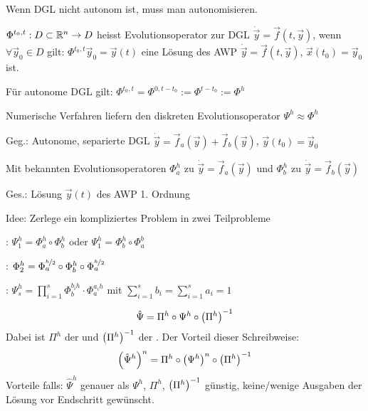 Wenn DGL nicht autonom ist, muss man autonomisieren.

\vspace{1\baselineskip}


$\Phi^{t_0,t} : D \subset \mathbb{R}^n \rightarrow D$ heisst Evolutionsoperator zur DGL
$\dot{\vec{y}} = \vec{f}(t,\vec{y})$, wenn $\forall \vec{y}_0 \in D$ gilt:
$\Phi^{t_0 , t} \vec{y}_0 = \vec{y} (t)$ eine Lösung des AWP $\dot{\vec{y}}=\vec{f}(t,\vec{y})$,
$\vec{x}(t_0) = \vec{y}_0$ ist.

Für autonome DGL gilt: $\Phi^{t_0 , t} = \Phi^{0,t-t_0} := \Phi^{t-t_0} := \Phi^h$

Numerische Verfahren liefern den diskreten Evolutionsoperator $\Psi^h \approx \Phi^h$

\vspace{1\baselineskip}

Geg.: Autonome, separierte DGL $\dot{\vec{y}} = \vec{f}_a (\vec{y}) + \vec{f}_b (\vec{y})$,
$\vec{y}(t_0) = \vec{y}_0$

Mit bekannten Evolutionsoperatoren $\Phi_a^h$ zu $\dot{\vec{y}} = \vec{f}_a (\vec{y})$ und
$\Phi_b^h$ zu $\dot{\vec{y}} = \vec{f}_b (\vec{y})$

Ges.: Lösung $\vec{y}(t)$ des AWP 1. Ordnung

Idee: Zerlege ein kompliziertes Problem in zwei Teilprobleme

\vspace{1\baselineskip}

: $\Psi_1^h = \Phi_a^h \circ \Phi_b^h$ oder $\Psi_1^h = \Phi_b^h \circ \Phi_a^b$

: $\Phi_2^h = \Phi_a^{\nicefrac{h}{2}} \circ \Phi_b^h \circ \Phi_a^{\nicefrac{h}{2}}$

: $\Psi_s^h = \prod_{i=1}^{s} \Phi_b^{b_i h} \cdot \Phi_a^{a_i h}$ mit
        $\sum_{i=1}^{s} b_i = \sum_{i=1}^{s} a_i = 1$

\vspace{1\baselineskip}


\vspace{1\baselineskip}

\begin{align*}
    \hat{\Psi} = \Pi^h \circ \Psi^h \circ \left( \Pi^h \right)^{-1}
\end{align*}
Dabei ist $\Pi^h$ der  und $\left( \Pi^h \right)^{-1}$ der .
Der Vorteil dieser Schreibweise:
\begin{align*}
    \left( \hat{\Psi}^h \right)^n = \Pi^h \circ \left( \Psi^h \right)^n \circ \left( \Pi^h \right)^{-1}
\end{align*}
Vorteile falls:
$\hat{\Psi}^h$ genauer als $\Psi^h$,
$\Pi^h$, $\left( \Pi^h \right)^{-1}$ günstig,
keine/wenige Ausgaben der Lösung vor Endschritt gewünscht.
